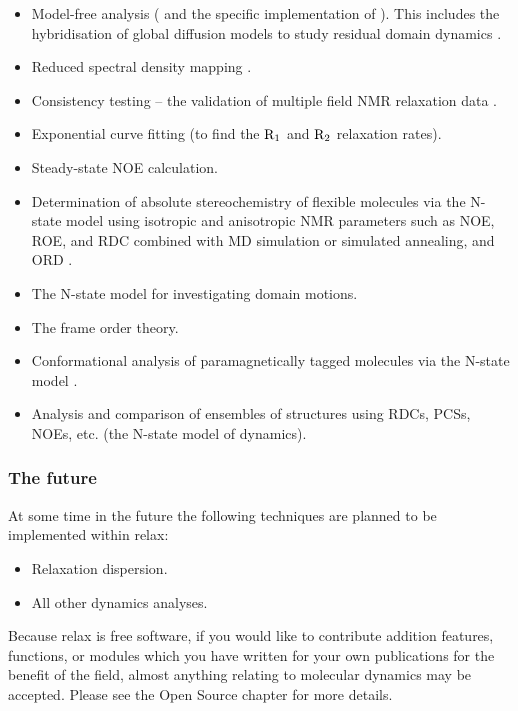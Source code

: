 \begin{itemize}
\item Model-free analysis (\citet{LipariSzabo82a, LipariSzabo82b, Clore90a} and the specific implementation of \citet{dAuvergneGooley03,dAuvergneGooley06,dAuvergneGooley07,dAuvergneGooley08a,dAuvergneGooley08b}).  This includes the hybridisation of global diffusion models to study residual domain dynamics \citep{Horne07}.
\item Reduced spectral density mapping \citep{Farrow95, Lefevre96}.
\item Consistency testing -- the validation of multiple field NMR relaxation data \citep{MorinGagne09}.
\item Exponential curve fitting (to find the $\mathrm{R}_1$ and $\mathrm{R}_2$ relaxation rates).
\item Steady-state NOE calculation.
\item Determination of absolute stereochemistry of flexible molecules via the N-state model using isotropic and anisotropic NMR parameters such as NOE, ROE, and RDC combined with MD simulation or simulated annealing, and ORD \citep{Sun11}.
\item The N-state model for investigating domain motions.
\item The frame order theory.
\item Conformational analysis of paramagnetically tagged molecules via the N-state model \citep{Erdelyi11}.
\item Analysis and comparison of ensembles of structures using RDCs, PCSs, NOEs, etc. (the N-state model of dynamics).
\end{itemize}


\subsubsection{The future}

At some time in the future the following techniques are planned to be implemented within relax:

\begin{itemize}
\item Relaxation dispersion.
\item All other dynamics analyses.
\end{itemize}

Because relax is free software, if you would like to contribute addition features, functions, or modules which you have written for your own publications for the benefit of the field, almost anything relating to molecular dynamics may be accepted.  Please see the Open Source chapter for more details.



